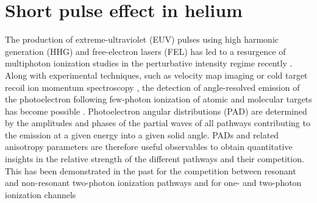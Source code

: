 \section{Short pulse effect in helium} %
\label{sec:short_pulse_effect}
The production of extreme-ultraviolet (EUV) pulses using high harmonic generation (HHG) and free-electron lasers (FEL) has led to a resurgence of multiphoton ionization studies in the perturbative intensity regime recently \cite{nikolopoulos2001,vanderhart2005,shakeshaft2007,pi2010,florescu2011,sato2011,haber2011,florescu2012,ishikawa2012,ishikawa2013,ma2013,rey2014,grum-grzhimailo2015,douguet2016,hofbrucker2017,hofbrucker2018,boll2019,wang2019}. Along with experimental techniques, such as velocity map imaging \cite{kornilov2010,rouzee2011} or cold target recoil ion momentum spectroscopy \cite{ullrich2003}, the detection of angle-resolved emission of the photoelectron following few-photon ionization of atomic and molecular targets has become possible \cite{ma2013}. Photoelectron angular distributions (PAD) are determined by the amplitudes and phases of the partial waves of all pathways contributing to the emission at a given energy into a given solid angle. PADs and related anisotropy parameters are therefore useful observables to obtain quantitative insights in the relative strength of the different pathways and their competition. This has been demonstrated in the past for the competition between resonant and non-resonant two-photon ionization pathways \cite{ishikawa2012,ishikawa2013,ma2013} and for one- and two-photon ionization channels \cite{grum-grzhimailo2015,douguet2016,boll2019}

